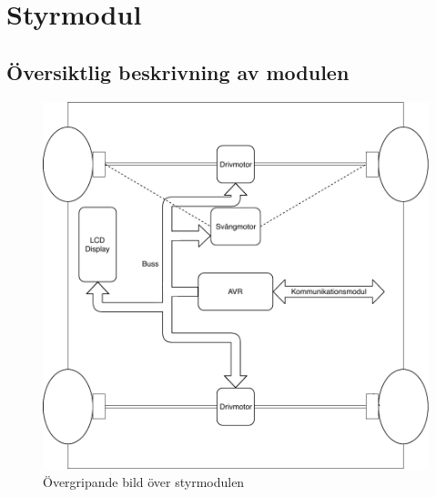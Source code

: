\documentclass[systemskiss/skiss.tex]{subfiles}
\begin{document}
\section{Styrmodul}
\subsection{Översiktlig beskrivning av modulen}
\begin{figure}[h]
    \centering
    \includegraphics[width=0.6\linewidth]{systemskiss/figures/styrmodul.pdf}
    \caption{Övergripande bild över styrmodulen}
    \label{fig:styrskiss}
\end{figure}
\end{document}
